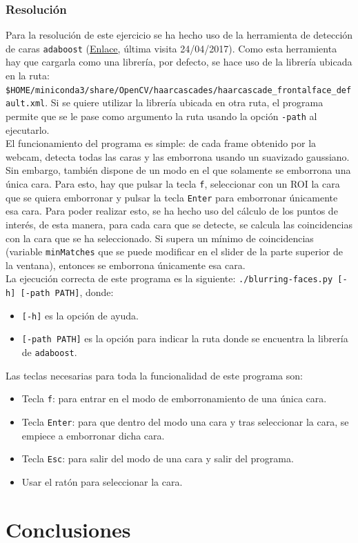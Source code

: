 \documentclass[a4paper,10pt,titlepage,oneside,openright]{book}
\begin{document}
\subsubsection*{Resolución}
Para la resolución de este ejercicio se ha hecho uso de la herramienta de detección de caras \texttt{adaboost} (\href{https://en.wikipedia.org/wiki/Viola\%E2\%80\%93Jones\_object\_detection\_framework}{\color{blue}\underline{Enlace}}, última visita 24/04/2017). Como esta herramienta hay que cargarla como una librería, por defecto, se hace uso de la librería ubicada en la ruta: \texttt{\$HOME/miniconda3/share/OpenCV/haarcascades/haarcascade\_frontalface\_default.xml}. Si se quiere utilizar la librería ubicada en otra ruta, el programa permite que se le pase como argumento la ruta usando la opción \texttt{-path} al ejecutarlo. \\

El funcionamiento del programa es simple: de cada frame obtenido por la webcam, detecta todas las caras y las emborrona usando un suavizado gaussiano. Sin embargo, también dispone de un modo en el que solamente se emborrona una única cara. Para esto, hay que pulsar la tecla \texttt{f}, seleccionar con un ROI la cara que se quiera emborronar y pulsar la tecla \texttt{Enter} para emborronar únicamente esa cara. Para poder realizar esto, se ha hecho uso del cálculo de los puntos de interés, de esta manera, para cada cara que se detecte, se calcula las coincidencias con la cara que se ha seleccionado. Si supera un mínimo de coincidencias (variable \texttt{minMatches} que se puede modificar en el slider de la parte superior de la ventana), entonces se emborrona únicamente esa cara. \\

La ejecución correcta de este programa es la siguiente: \texttt{./blurring-faces.py [-h] [-path PATH]}, donde:
\begin{itemize}
 \item \texttt{[-h]} es la opción de ayuda.
 \item \texttt{[-path PATH]} es la opción para indicar la ruta donde se encuentra la librería de \texttt{adaboost}.
\end{itemize}

Las teclas necesarias para toda la funcionalidad de este programa son:
\begin{itemize}
 \item Tecla \texttt{f}: para entrar en el modo de emborronamiento de una única cara.
 \item Tecla \texttt{Enter}: para que dentro del modo una cara y tras seleccionar la cara, se empiece a emborronar dicha cara.
 \item Tecla \texttt{Esc}: para salir del modo de una cara y salir del programa.
 \item Usar el ratón para seleccionar la cara.
\end{itemize}



\medskip
\section{Conclusiones}
\end{document}
